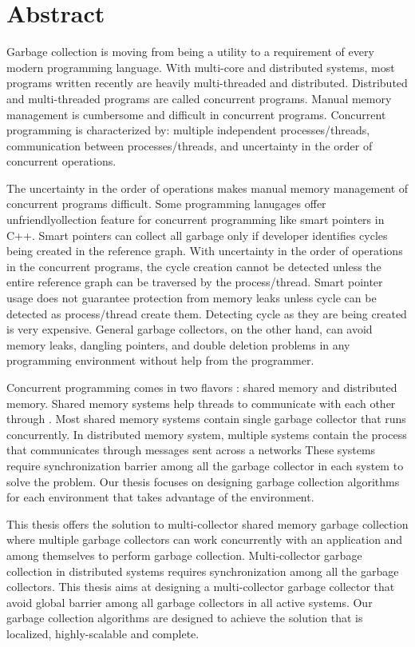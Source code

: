 \chapter*{Abstract}
\label{ch:abstract}
Garbage collection is moving from being a utility to a requirement of every modern programming language. 
With multi-core and distributed systems, most programs written recently are heavily multi-threaded and distributed. Distributed and multi-threaded programs are called concurrent programs. Manual memory management is cumbersome and difficult in concurrent programs.  Concurrent programming is characterized by: multiple independent processes/threads, communication between processes/threads, and uncertainty in the order of concurrent operations.

The uncertainty in the order of operations makes manual memory management of concurrent programs difficult. Some programming lanugages offer unfriendlyollection feature for concurrent programming like smart pointers in C++.
Smart pointers can collect all garbage only if developer identifies cycles being created in the reference graph. With uncertainty in the order of operations in the concurrent programs, the cycle creation cannot be detected unless the entire reference graph can be traversed by the process/thread.
Smart pointer usage does not guarantee protection from memory leaks unless cycle can be detected as process/thread create them. Detecting cycle as they are being created is very expensive.
General garbage collectors, on the other hand, can avoid memory leaks, dangling pointers, and double deletion problems in any programming environment without help from the programmer.

Concurrent programming comes in two flavors : shared memory and distributed memory. Shared memory systems help threads to communicate with each other through . Most shared memory systems contain single garbage collector that runs concurrently. In distributed memory system, multiple systems contain the process that communicates through messages sent across a networks These systems require synchronization barrier among all the garbage collector in each system to solve the problem. Our thesis focuses on designing garbage collection algorithms for each environment that takes advantage of the environment. 

This thesis offers the solution to multi-collector shared memory garbage collection where multiple garbage collectors can work concurrently with an application and among themselves to perform garbage collection. Multi-collector garbage collection in distributed systems requires synchronization among all the garbage collectors. This thesis aims at designing a multi-collector garbage collector that avoid global barrier among all garbage collectors in all active systems. Our garbage collection algorithms are designed to achieve the solution that is localized, highly-scalable and complete.
